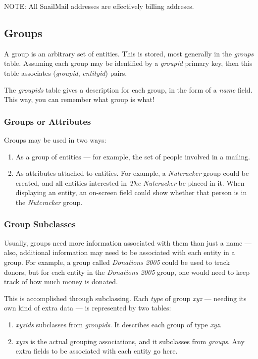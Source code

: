 \documentclass[11pt]{article}
\begin{document}
NOTE: All SnailMail addresses are effectively billing addreses.

\subsection{Groups}

A group is an arbitrary set of entities.  This is stored, most generally in the \emph{groups} table.  Assuming each group may be identified by a \emph{groupid} primary key, then this table associates (\emph{groupid}, \emph{entityid}) pairs.

The \emph{groupids} table gives a description for each group, in the form of a \emph{name} field.  This way, you can remember what group is what!

\subsubsection{Groups or Attributes}

Groups may be used in two ways:

\begin{enumerate}
 \item As a group of entities --- for example, the set of people involved in a mailing.
 \item As attributes attached to entities.  For example, a \emph{Nutcracker} group could be created, and all entities interested in \emph{The Nutcracker} be placed in it.  When displaying an entity, an on-screen field could show whether that person is in the \emph{Nutcracker} group.
 \end{enumerate}

\subsubsection{Group Subclasses}

Usually, groups need more information associated with them than just a name --- also, additional information may need to be associated with each entity in a group.  For example, a group called \emph{Donations 2005} could be used to track donors, but for each entity in the \emph{Donations 2005} group, one would need to keep track of how much money is donated.

This is accomplished through subclassing. Each \emph{type} of group \emph{xyz} --- needing its own kind of extra data --- is represented by two tables:
	\begin{enumerate}
 \item \emph{xyzids} subclasses from \emph{groupids}.  It describes each group of type \emph{xyz}.
 \item \emph{xyzs} is the actual grouping associations, and it subclasses from \emph{groups}.  Any extra fields to be associated with each entity go here.
 \end{enumerate}
\end{document}
